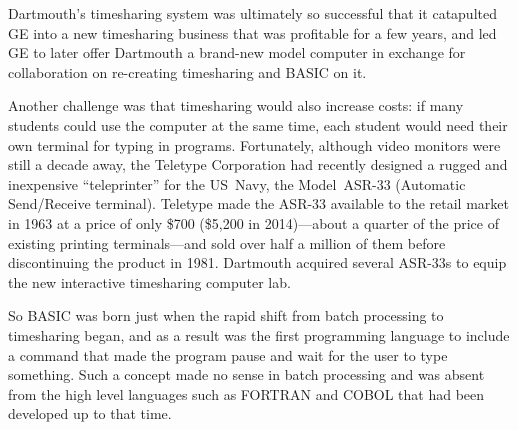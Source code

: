 \begin{tangent}
Dartmouth's timesharing system was ultimately so successful that it
catapulted GE into a new timesharing business that was profitable for a
few years, and led GE to later offer Dartmouth a brand-new model
computer in exchange for collaboration on re-creating timesharing and
BASIC on it.
\end{tangent}



Another challenge was that timesharing would also increase costs:
if many students could use the computer at the same time, each student
would need their own terminal for typing in programs.
Fortunately, although video monitors were still a decade away, 
the Teletype Corporation had recently designed a rugged and
inexpensive ``teleprinter'' for the US~Navy, the Model~ASR-33 (Automatic
Send/Receive terminal).  Teletype made the ASR-33
available to the retail market in 1963 at a price of only \$700 (\$5,200
in 2014)---about a quarter of the price of existing printing
terminals---and sold over
half a million of them before discontinuing the product in 1981.
Dartmouth acquired several ASR-33s to equip the new interactive
timesharing computer lab.


So BASIC was born just when the rapid shift from batch processing to
timesharing began, and as a result
was the first programming language to include a command that made
the program pause and wait for the user to type
something.  Such a concept made no sense in batch processing and was
absent from the high level languages such as FORTRAN and COBOL that had
been developed up to that time.
 
